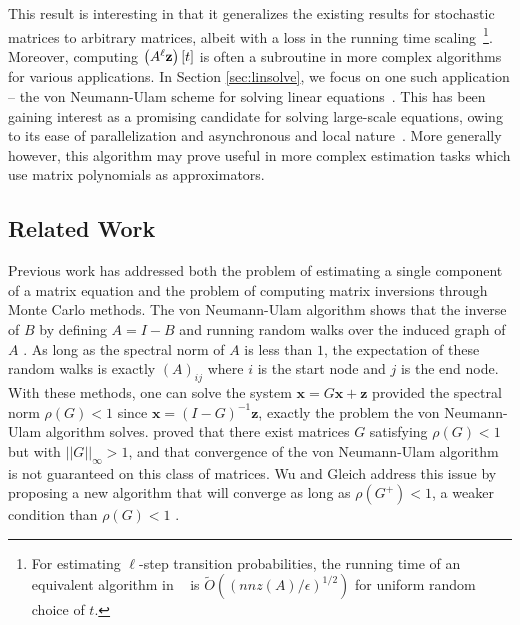 This result is interesting in that it generalizes the existing results for stochastic matrices to arbitrary matrices, albeit with a loss in the running time scaling~\footnote{For estimating $\ell$-step transition probabilities, the running time of an equivalent algorithm in ~\cite{banerjee2015fast} is $\widetilde{O}\left(\left(nnz(A)/\epsilon\right)^{1/2}\right)$ for uniform random choice of $t$.}. 
Moreover, computing $\left(A^{\ell}\mathbf{z}\right)[t]$ is often a subroutine in more complex algorithms for various applications.
In Section \ref{sec:linsolve}, we focus on one such application -- the von Neumann-Ulam scheme for solving linear equations~\cite{forsythe1950matrix}. 
This has been gaining interest as a promising candidate for solving large-scale equations, owing to its ease of parallelization and asynchronous and local nature~\cite{ji2013convergence,dimov2015new,lee2014asynchronous}. 
More generally however, this algorithm may prove useful in more complex estimation tasks which use matrix polynomials as approximators. 


\subsection{Related Work}

Previous work has addressed both the problem of estimating a single component of a matrix equation and the problem of computing matrix inversions through Monte Carlo methods. The von Neumann-Ulam algorithm shows that the inverse of $B$ by defining $A = I - B$ and running random walks over the induced graph of $A$ \cite{forsythe1950matrix}. As long as the spectral norm of $A$ is less than $1$, the expectation of these random walks is exactly $(A)_{ij}$ where $i$ is the start node and $j$ is the end node. With these methods, one can solve the system $\mathbf{x} = G\mathbf{x} + \mathbf{z}$ provided the spectral norm $\rho(G) < 1$ since $\mathbf{x} = (I-G)^{-1}\mathbf{z}$, exactly the problem the von Neumann-Ulam algorithm solves. \cite{ji2013convergence} proved that there exist matrices $G$ satisfying $\rho(G) < 1$ but with $||G||_\infty > 1$, and that convergence of the von Neumann-Ulam algorithm is not guaranteed on this class of matrices.  Wu and Gleich address this issue by proposing a new algorithm that will converge as long as $\rho(G^+) < 1$, a weaker condition than $\rho(G) < 1$ \cite{wu2016multi}.

